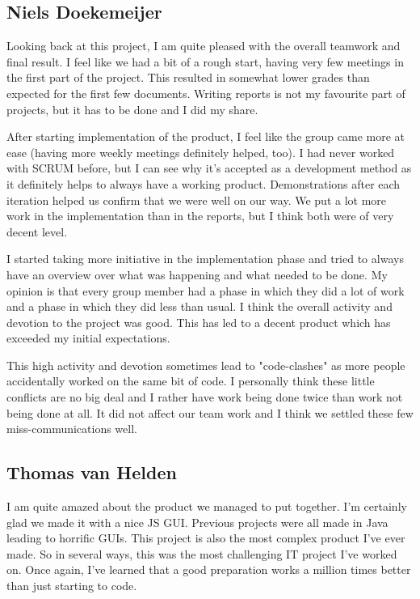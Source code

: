 \documentclass[a4paper]{article}
\begin{document}
\subsection{Niels Doekemeijer}
Looking back at this project, I am quite pleased with the overall teamwork and final result. I feel like we had a bit of a rough start, having very few meetings in the first part of the project. This resulted in somewhat lower grades than expected for the first few documents. Writing reports is not my favourite part of projects, but it has to be done and I did my share.

After starting implementation of the product, I feel like the group came more at ease (having more weekly meetings definitely helped, too). I had never worked with SCRUM before, but I can see why it's accepted as a development method as it definitely helps to always have a working product. Demonstrations after each iteration helped us confirm that we were well on our way. We put a lot more work in the implementation than in the reports, but I think both were of very decent level.

I started taking more initiative in the implementation phase and tried to always have an overview over what was happening and what needed to be done. My opinion is that every group member had a phase in which they did a lot of work and a phase in which they did less than usual. I think the overall activity and devotion to the project was good. This has led to a decent product which has exceeded my initial expectations.

This high activity and devotion sometimes lead to "code-clashes" as more people accidentally worked on the same bit of code. I personally think these little conflicts are no big deal and I rather have work being done twice than work not being done at all. It did not affect our team work and I think we settled these few miss-communications well.

\subsection{Thomas van Helden}
I am quite amazed about the product we managed to put together. I'm certainly glad we made it with a nice JS GUI. Previous projects were all made in Java leading to horrific GUIs. This project is also the most complex product I've ever made. So in several ways, this was the most challenging IT project I've worked on. Once again, I've learned that a good preparation works a million times better than just starting to code. 
\end{document}
